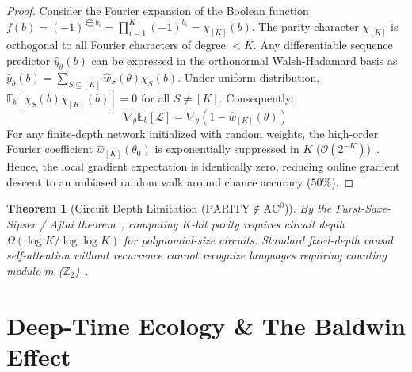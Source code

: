 \documentclass[10pt,journal,compsoc]{IEEEtran}
\newtheorem{theorem}{Theorem}
\begin{document}
\begin{proof}
Consider the Fourier expansion of the Boolean function $f(b) = (-1)^{\bigoplus b_i} = \prod_{i=1}^K (-1)^{b_i} = \chi_{[K]}(b)$. The parity character $\chi_{[K]}$ is orthogonal to all Fourier characters of degree $< K$. Any differentiable sequence predictor $\hat{y}_\theta(b)$ can be expressed in the orthonormal Walsh-Hadamard basis as $\hat{y}_\theta(b) = \sum_{S \subseteq [K]} \hat{w}_S(\theta) \chi_S(b)$.
Under uniform distribution, $\mathbb{E}_b [\chi_S(b) \chi_{[K]}(b)] = 0$ for all $S \ne [K]$. Consequently:
\begin{equation}
\nabla_\theta \mathbb{E}_b [\mathcal{L}] = \nabla_\theta \left( 1 - \hat{w}_{[K]}(\theta) \right)
\end{equation}
For any finite-depth network initialized with random weights, the high-order Fourier coefficient $\hat{w}_{[K]}(\theta_0)$ is exponentially suppressed in $K$ ($\mathcal{O}(2^{-K})$)~\cite{shalev2017failures, abbe2023learning}. Hence, the local gradient expectation is identically zero, reducing online gradient descent to an unbiased random walk around chance accuracy ($50\%$).
\end{proof}

\begin{theorem}[Circuit Depth Limitation ($\text{PARITY} \notin \text{AC}^0$)]
By the Furst-Saxe-Sipser / Ajtai theorem~\cite{furst1984parity}, computing $K$-bit parity requires circuit depth $\Omega(\log K / \log \log K)$ for polynomial-size circuits. Standard fixed-depth causal self-attention without recurrence cannot recognize languages requiring counting modulo $m$ ($\mathbb{Z}_2$)~\cite{hahn2020theoretical}.
\end{theorem}

\section{Deep-Time Ecology \& The Baldwin Effect}
\label{sec:ecology}
\end{document}
